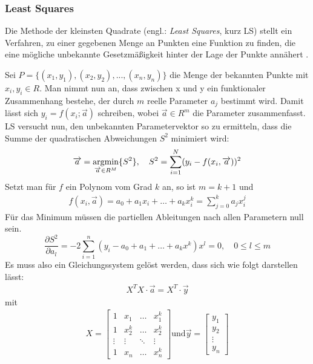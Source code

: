 \subsubsection{Least Squares}

Die Methode der kleinsten Quadrate (engl.: \emph{Least Squares}, kurz LS) stellt ein Verfahren, zu einer gegebenen Menge an Punkten eine Funktion zu finden, die eine mögliche unbekannte Gesetzmäßigkeit hinter der Lage der Punkte annähert \cite{lsq_wolfram}.

Sei $P = \{(x_1, y_1), (x_2, y_2), ..., (x_n, y_n)\}$ die Menge der bekannten Punkte mit $x_i, y_i \in R$. Man nimmt nun an, dass zwischen x und y ein funktionaler Zusammenhang bestehe, der durch $m$ reelle Parameter $a_j$ bestimmt wird. Damit lässt sich $y_i = f(x_i; \overrightarrow{a})$ schreiben, wobei $\overrightarrow{a} \in R^m$ die Parameter zusammenfasst. LS versucht nun, den unbekannten Parametervektor so zu ermitteln, dass die Summe der quadratischen Abweichungen $S^2$ minimiert wird:
\begin{equation}
\begin{split}
\overrightarrow{a} = \mathop{\mathrm{argmin}}_{\overrightarrow{a} \in R^M} \{ S^2 \}, \quad
S^2 =  \sum_{i=1}^{N} (y_i - f(x_i, \overrightarrow{a}))^2
\end{split}
\label{eq:opt}
\end{equation}
Setzt man für $f$ ein Polynom vom Grad $k$ an, so ist $m = k+1$ und
\begin{gather}
f(x_i, \overrightarrow{a}) = a_0 + a_1 x_i + \dots + a_k x_i^k = \sum_{j = 0}^{k} a_j x_i^j %
\end{gather}
Für das Minimum müssen die partiellen Ableitungen nach allen Parametern null sein.
\begin{equation}
\frac{\partial S^2}{\partial a_l} = -2 \sum_{i=1}^{n}(y_i - a_0 + a_1 + \dots + a_k x^k) x^l = 0, \quad 0 \leq l \leq m
\end{equation}
Es muss also ein Gleichungssystem gelöst werden, dass sich wie folgt darstellen lässt:
\begin{gather}
X^T X \cdot \overrightarrow{a} = X^T \cdot
\overrightarrow{y} \label{eq:solution}
\end{gather}
mit 
\begin{gather}
X =
\begin{bmatrix}
1 & x_1 & \dots & x_1^k \\
1 & x_2^k & \dots & x_2^k \\
\vdots & \vdots & \ddots & \vdots \\
1 & x_n & \dots & x_n^k
\end{bmatrix}
\text{und} \overrightarrow{y} = \begin{bmatrix}
y_1 \\ y_2 \\ \vdots \\ y_n
\end{bmatrix}
\end{gather}
